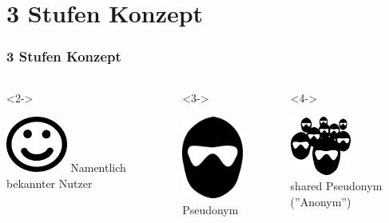 \section{3 Stufen Konzept}
\begin{frame}
	\frametitle{3 Stufen Konzept}
	\begin{columns}
		\begin{column}{3.3cm}<2->
			\begin{center}
			\includegraphics[width=2cm]{AASmile.png}
			\vspace{1cm}
			Namentlich bekannter Nutzer
			\end{center}
		\end{column}
		\begin{column}{3.3cm}<3->
			\begin{center}
			\includegraphics[width=2cm]{AAEiner.png}
			\vspace{1cm}
			Pseudonym
			\end{center}
		\end{column}
		\begin{column}{3.3cm}<4->
			\begin{center}
			\includegraphics[width=2cm]{AAViele.png}
			\vspace{1cm}
			\\
			shared Pseudonym (''Anonym'')
			\end{center}
		\end{column}
	\end{columns}
\end{frame}

